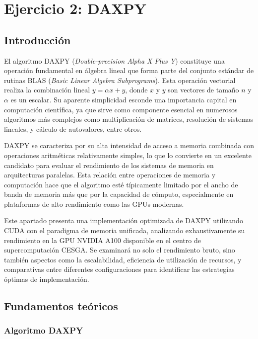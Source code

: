 \chapter{Ejercicio 2: DAXPY}

\section{Introducción}

    El algoritmo DAXPY (\textit{Double-precision Alpha X Plus Y}) constituye una operación fundamental en álgebra lineal que forma parte del conjunto estándar de rutinas BLAS (\textit{Basic Linear Algebra Subprograms}). Esta operación vectorial realiza la combinación lineal $y = \alpha x + y$, donde $x$ y $y$ son vectores de tamaño $n$ y $\alpha$ es un escalar. Su aparente simplicidad esconde una importancia capital en computación científica, ya que sirve como componente esencial en numerosos algoritmos más complejos como multiplicación de matrices, resolución de sistemas lineales, y cálculo de autovalores, entre otros.

    DAXPY se caracteriza por su alta intensidad de acceso a memoria combinada con operaciones aritméticas relativamente simples, lo que lo convierte en un excelente candidato para evaluar el rendimiento de los sistemas de memoria en arquitecturas paralelas. Esta relación entre operaciones de memoria y computación hace que el algoritmo esté típicamente limitado por el ancho de banda de memoria más que por la capacidad de cómputo, especialmente en plataformas de alto rendimiento como las GPUs modernas.
    
    Este apartado presenta una implementación optimizada de DAXPY utilizando CUDA con el paradigma de memoria unificada, analizando exhaustivamente su rendimiento en la GPU NVIDIA A100 disponible en el centro de supercomputación CESGA. Se examinará no solo el rendimiento bruto, sino también aspectos como la escalabilidad, eficiencia de utilización de recursos, y comparativas entre diferentes configuraciones para identificar las estrategias óptimas de implementación.

\newpage
    
\section{Fundamentos teóricos}

    \subsection{Algoritmo DAXPY}
    
